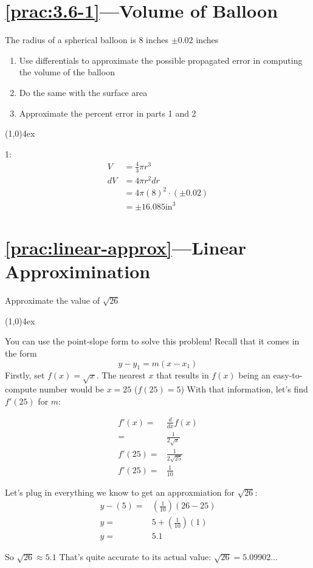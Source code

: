 \documentclass{MathNotes}
\newcommand{\br}{
	\begin{center}
		\line(1,0){4ex}
	\end{center}}
\begin{document}
\section*{\ref{prac:3.6-1}---Volume of Balloon}\label{ans:3.6-1}
The radius of a spherical balloon is 8 inches $\pm 0.02$ inches
\begin{enumerate}
	\item Use differentials to approximate the possible propagated error in computing the volume of the balloon
	\item Do the same with the surface area
	\item Approximate the percent error in parts 1 and 2
\end{enumerate}
\br
1:
\begin{align*}
	V  & =\frac{4}{3}\pi r^3       \\
	dV & =4\pi r^2 dr              \\
	   & =4\pi(8)^2\cdot(\pm 0.02) \\
	   & =\pm 16.085 \text{in}^3
\end{align*}

\section*{\ref{prac:linear-approx}---Linear Approximination}\label{ans:linear-approx}
Approximate the value of $\sqrt{26}$
\br
You can use the point-slope form to solve this problem! Recall that it comes in
the form \[y-y_1=m(x-x_1)\] Firstly, set $f(x)=\sqrt{x}$. The nearest $x$ that
results in $f(x)$ being an easy-to-compute number would be $x=25$ ($f(25)=5$)
With that information, let's find $f'(25)$ for $m$:

\begin{align*}
    f'(x) =& \frac{d}{dx}f(x)\\
     =& \frac{1}{2\sqrt{x}} \\
    f'(25) =& \frac{1}{2\sqrt{25}} \\
    f'(25) =& \frac{1}{10} 
\end{align*}

Let's plug in everything we know to get an approxmiation for $\sqrt{26}$:
\begin{align*}
    y-(5) =& (\frac{1}{10})(26-25)\\
    y =& 5 + (\frac{1}{10})(1)\\
    y =& 5.1
\end{align*}

So $\sqrt{26}\approx 5.1$\newline
That's quite accurate to its actual value: $\sqrt{26}=5.09902\ldots$
\end{document}
